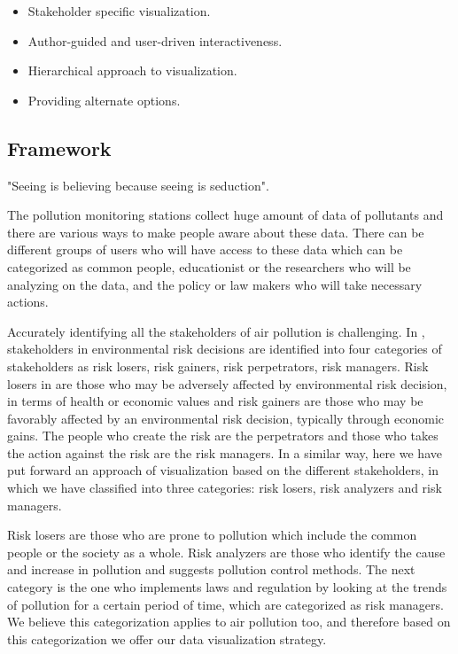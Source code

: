 \begin{itemize}

\item Stakeholder specific  visualization.

\item Author-guided and user-driven interactiveness.

\item Hierarchical approach to visualization.

\item Providing alternate options.

\end{itemize}

\subsection{Framework}

"Seeing is believing because seeing is seduction"\cite{Hepworth}.

The pollution monitoring stations collect huge amount of data of pollutants and there are various ways to make people aware about these data. There can be different groups of users who will have access to these data which can be categorized as common people, educationist or the researchers who will be analyzing on the data, and the policy or law makers who will take necessary actions.

Accurately identifying all the stakeholders of air pollution is challenging. In \cite{English2000}, stakeholders in environmental risk decisions are identified into four categories of stakeholders as risk losers, risk gainers, risk perpetrators, risk managers. 
Risk losers in \cite{English2000} are those who may be adversely affected by environmental risk decision, in terms of health or economic values and risk gainers are those who may be favorably affected by an environmental risk decision, typically through economic gains. The people who create the risk are the perpetrators and those who takes the action against the risk are the risk managers. In a similar way, here we have put forward an approach of visualization based on the different stakeholders, in which we have classified into three categories: risk losers, risk analyzers and risk managers. 

Risk losers are those who are prone to pollution which include the common people or the society as a whole. Risk analyzers are those who identify the cause and increase in pollution and suggests pollution control methods. The next category is the one who implements laws and regulation by looking at the trends of pollution for a certain period of time, which are categorized as risk managers. 
We believe this categorization applies to air pollution too, and therefore based on this categorization we offer our data visualization strategy.

